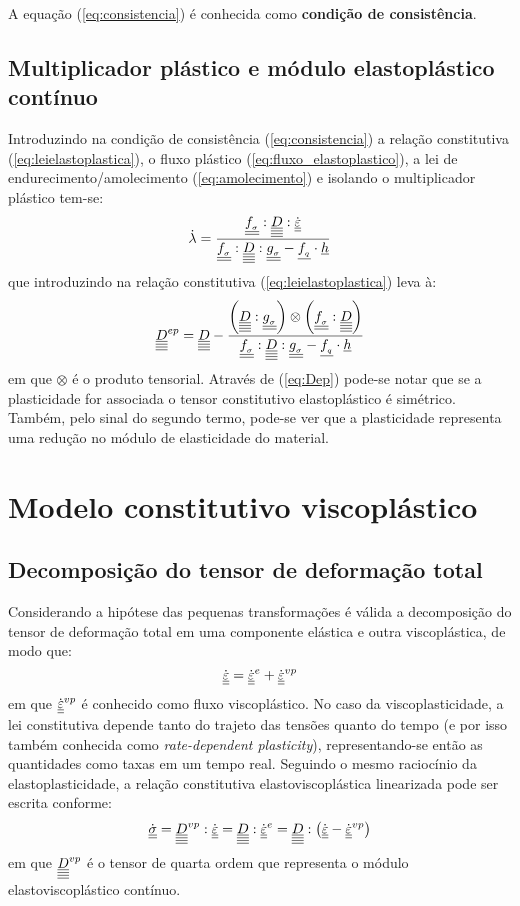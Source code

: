 A equação (\ref{eq:consistencia}) é conhecida como \textbf{condição de consistência}.

\subsection{Multiplicador plástico e módulo elastoplástico contínuo}
Introduzindo na condição de consistência (\ref{eq:consistencia}) a relação constitutiva (\ref{eq:leielastoplastica}), o fluxo plástico (\ref{eq:fluxo_elastoplastico}), a lei de endurecimento/amolecimento (\ref{eq:amolecimento}) e isolando o multiplicador plástico tem-se:
\begin{equation}
	\label{eq:lambda}
	\dot \lambda = \dfrac{\underline{\underline {f_{_\sigma}}}:\underline{\underline{\underline{\underline D}}}:\dot {\underline{\underline \varepsilon}}}{\underline{\underline {f_{_\sigma}}}:\underline{\underline{\underline{\underline D}}}:\underline{\underline {g_{_\sigma}}}-\underline{f_{_q}} \cdot \underline h}
\end{equation}
que introduzindo na relação constitutiva (\ref{eq:leielastoplastica}) leva à:
\begin{equation}
	\label{eq:Dep}
	\underline{\underline{\underline{\underline D}}}^{ep} = \underline{\underline{\underline{\underline D}}} - \dfrac{\left(\underline{\underline{\underline{\underline D}}}:\underline{\underline {g_{_\sigma}}} \right)\otimes\left(\underline{\underline {f_{_\sigma}}}:\underline{\underline{\underline{\underline D}}} \right)}{\underline{\underline {f_{_\sigma}}}:\underline{\underline{\underline{\underline D}}}:\underline{\underline {g_{_\sigma}}}-\underline{f_{_q}} \cdot \underline h}
\end{equation}
em que $\otimes$ é o produto tensorial. Através de (\ref{eq:Dep}) pode-se notar que se a plasticidade for associada o tensor constitutivo elastoplástico é simétrico. Também, pelo sinal do segundo termo, pode-se ver que a plasticidade representa uma redução no módulo de elasticidade do material.

\section{Modelo constitutivo viscoplástico}

\subsection{Decomposição do tensor de deformação total}
Considerando a hipótese das pequenas transformações é válida a decomposição do tensor de deformação total em uma componente elástica e outra viscoplástica, de modo que:
\begin{equation}
	\label{eq:decomposicao_deformacoes_vp}
	\dot {\underline{\underline \varepsilon}} = \dot {\underline{\underline \varepsilon}}^e + \dot {\underline{\underline \varepsilon}}^{vp} 
\end{equation}
em que $\dot {\underline{\underline \varepsilon}}^{vp}$ é conhecido como fluxo viscoplástico. No caso da viscoplasticidade, a lei constitutiva depende tanto do trajeto das tensões quanto do tempo (e por isso também conhecida como \textit{rate-dependent plasticity}), representando-se então as quantidades como taxas em um tempo real. Seguindo o mesmo raciocínio da elastoplasticidade, a relação constitutiva elastoviscoplástica linearizada pode ser escrita conforme:
\begin{equation}
	\label{eq:leielastoviscoplastica}
	\dot {\underline{\underline \sigma}} = \underline{\underline{\underline{\underline D}}}^{vp}:\dot {\underline{\underline \varepsilon}} = \underline{\underline{\underline{\underline D}}}:\dot {\underline{\underline \varepsilon}}^e = \underline{\underline{\underline{\underline D}}}:\left(\dot {\underline{\underline \varepsilon}} - \dot {\underline{\underline \varepsilon}}^{vp} \right)
\end{equation}
em que $\underline{\underline{\underline{\underline D}}}^{vp}$ é o tensor de quarta ordem que representa o módulo elastoviscoplástico contínuo.


